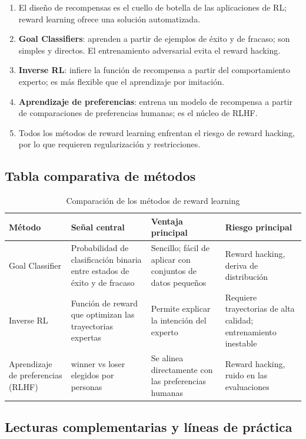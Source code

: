 \documentclass[a4paper]{article}
\begin{document}
\begin{enumerate}
    \item El diseño de recompensas es el cuello de botella de las aplicaciones de RL; reward learning ofrece una solución automatizada.
    \item \textbf{Goal Classifiers}: aprenden a partir de ejemplos de éxito y de fracaso; son simples y directos. El entrenamiento adversarial evita el reward hacking.
    \item \textbf{Inverse RL}: infiere la función de recompensa a partir del comportamiento experto; es más flexible que el aprendizaje por imitación.
    \item \textbf{Aprendizaje de preferencias}: entrena un modelo de recompensa a partir de comparaciones de preferencias humanas; es el núcleo de RLHF.
    \item Todos los métodos de reward learning enfrentan el riesgo de reward hacking, por lo que requieren regularización y restricciones.
\end{enumerate}

\subsection{Tabla comparativa de métodos}

\begin{table}[H]
\centering
\begin{tabular}{p{} p{} p{} p{}}
\toprule
Método & Señal central & Ventaja principal & Riesgo principal \\
\midrule
Goal Classifier & Probabilidad de clasificación binaria entre estados de éxito y de fracaso & Sencillo; fácil de aplicar con conjuntos de datos pequeños & Reward hacking, deriva de distribución \\
Inverse RL & Función de reward que optimizan las trayectorias expertas & Permite explicar la intención del experto & Requiere trayectorias de alta calidad; entrenamiento inestable \\
Aprendizaje de preferencias (RLHF) & winner vs loser elegidos por personas & Se alinea directamente con las preferencias humanas & Reward hacking, ruido en las evaluaciones \\
\bottomrule
\end{tabular}
\caption{Comparación de los métodos de reward learning}
\end{table}

\subsection{Lecturas complementarias y líneas de práctica}
\end{document}
